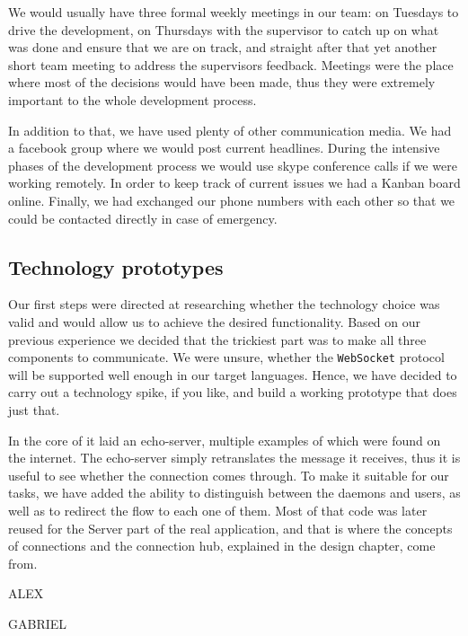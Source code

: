 \documentclass{l3proj}
\begin{document}
We would usually have three formal weekly meetings in our team: on Tuesdays to drive the development, on Thursdays with the supervisor to catch up on what was done and ensure that we are on track, and straight after that yet another short team meeting to address the supervisors feedback. Meetings were the place where most of the decisions would have been made, thus they were extremely important to the whole development process.

In addition to that, we have used plenty of other communication media. We had a facebook group where we would post current headlines. During the intensive phases of the development process we would use skype conference calls if we were working remotely. In order to keep track of current issues we had a Kanban board online. Finally, we had exchanged our phone numbers with each other so that we could be contacted directly in case of emergency.

\subsection{Technology prototypes}


Our first steps were directed at researching whether the technology choice was valid and would allow us to achieve the desired functionality. Based on our previous experience we decided that the trickiest part was to make all three components to communicate. We were unsure, whether the \texttt{WebSocket} protocol will be supported well enough in our target languages. Hence, we have decided to carry out a technology spike, if you like, and build a working prototype that does just that.

In the core of it laid an echo-server, multiple examples of which were found on the internet. The echo-server simply retranslates the message it receives, thus it is useful to see whether the connection comes through. To make it suitable for our tasks, we have added the ability to distinguish between the daemons and users, as well as to redirect the flow to each one of them. Most of that code was later reused for the Server part of the real application, and that is where the concepts of connections and the connection hub, explained in the design chapter, come from.


ALEX

GABRIEL

\end{document}
